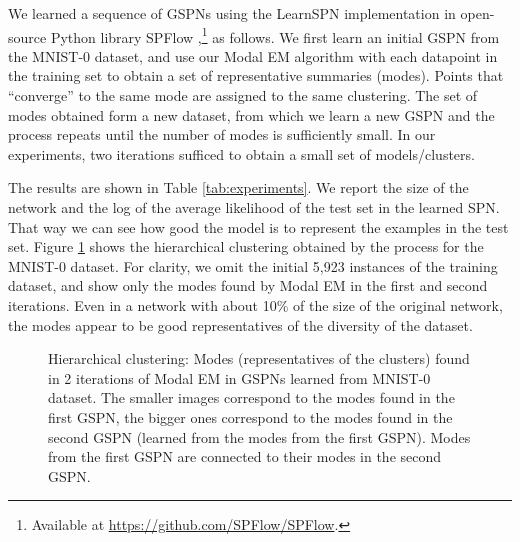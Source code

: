\documentclass[12pt]{article}
\begin{document}
We learned a sequence of GSPNs using the LearnSPN implementation in open-source Python library SPFlow \cite{Molina2019SPFlow},\footnote{Available at \url{https://github.com/SPFlow/SPFlow}.} as follows.
We first learn an initial GSPN from the MNIST-0 dataset, and use our Modal EM algorithm with each datapoint in the training set to obtain a set of representative summaries (modes).
Points that ``converge'' to the same mode are assigned to the same clustering.
The set of modes obtained form a new dataset, from which we learn a new GSPN and the process repeats until the number of modes is sufficiently small.
In our experiments, two iterations sufficed to obtain a small set of models/clusters.

The results are shown in Table \ref{tab:experiments}. 
We report the size of the network and the log of the average likelihood of the test set in the learned SPN. That way we can see how good the model is to represent the examples in the test set. Figure \ref{fig:clusters} shows the hierarchical clustering obtained by the process for the MNIST-0 dataset. For clarity, we omit the initial 5,923 instances of the training dataset, and show only the modes found by Modal EM in the first and second iterations. 
Even in a network with about 10\% of the size of the original network, the modes appear to be  good representatives of the diversity of the dataset.


\begin{figure}
    \centering
    \caption{Hierarchical clustering: Modes (representatives of the clusters) found in 2 iterations of Modal EM in GSPNs learned from MNIST-0 dataset. The smaller images correspond to the modes found in the first GSPN, the bigger ones correspond to the modes found in the second GSPN (learned from the modes from the first GSPN). Modes from the first GSPN are connected to their modes in the second GSPN.}
    \label{fig:clusters}
\end{figure}
\end{document}
